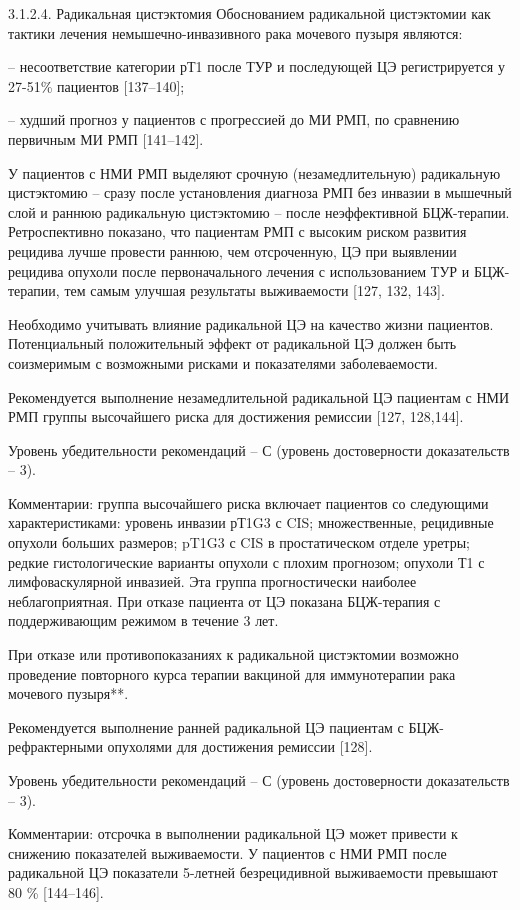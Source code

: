 3.1.2.4. Радикальная цистэктомия
Обоснованием радикальной цистэктомии как тактики лечения немышечно-инвазивного рака мочевого пузыря являются:

– несоответствие категории рТ1 после ТУР и последующей ЦЭ регистрируется у 27-51\% пациентов [137–140];

– худший прогноз у пациентов с прогрессией до МИ РМП, по сравнению первичным МИ РМП [141–142].

У пациентов с НМИ РМП выделяют срочную (незамедлительную) радикальную цистэктомию – сразу после установления диагноза РМП без инвазии в мышечный слой и раннюю радикальную цистэктомию – после неэффективной БЦЖ-терапии. Ретроспективно показано, что пациентам РМП с высоким риском развития рецидива лучше провести раннюю, чем отсроченную, ЦЭ при выявлении рецидива опухоли после первоначального лечения с использованием ТУР и БЦЖ-терапии, тем самым улучшая результаты выживаемости [127, 132, 143].

Необходимо учитывать влияние радикальной ЦЭ на качество жизни пациентов. Потенциальный положительный эффект от радикальной ЦЭ должен быть соизмеримым с возможными рисками и показателями заболеваемости.

Рекомендуется выполнение незамедлительной радикальной ЦЭ пациентам с НМИ РМП группы высочайшего риска для достижения ремиссии [127, 128,144].

Уровень убедительности рекомендаций – С (уровень достоверности доказательств – 3).

Комментарии: группа высочайшего риска включает пациентов со следующими характеристиками: уровень инвазии рТ1G3 с CIS; множественные, рецидивные опухоли больших размеров; pT1G3 с CIS в простатическом отделе уретры; редкие гистологические варианты опухоли с плохим прогнозом; опухоли Т1 с лимфоваскулярной инвазией. Эта группа прогностически наиболее неблагоприятная. При отказе пациента от ЦЭ показана БЦЖ-терапия с поддерживающим режимом в течение 3 лет.

При отказе или противопоказаниях к радикальной цистэктомии возможно проведение повторного курса терапии вакциной для иммунотерапии рака мочевого пузыря**. 

Рекомендуется выполнение ранней радикальной ЦЭ пациентам с БЦЖ-рефрактерными опухолями для достижения ремиссии [128].

Уровень убедительности рекомендаций – С (уровень достоверности доказательств – 3).

Комментарии: отсрочка в выполнении радикальной ЦЭ может привести к снижению показателей выживаемости. У пациентов с НМИ РМП после радикальной ЦЭ показатели 5-летней безрецидивной выживаемости превышают 80 \% [144–146].

